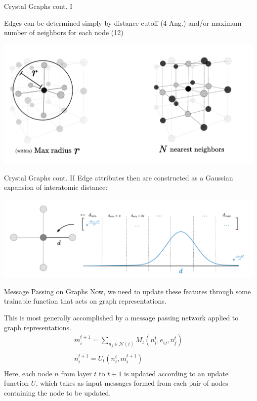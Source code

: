 \documentclass[11pt]{beamer}
\begin{document}
\begin{frame}{Crystal Graphs cont. I}

Edges can be determined simply by distance cutoff (4 Ang.) and/or maximum number of neighbors for each node (12)

\begin{center}
\includegraphics[scale=0.45]{ex_bondcriteria.pdf}
\end{center}
\end{frame}

\begin{frame}{Crystal Graphs cont. II}
Edge attributes then are constructed as a Gaussian expansion of interatomic distance:

\begin{center}
\includegraphics[scale=0.33]{bond_feat.pdf}
\end{center}
\end{frame}

\begin{frame}{Message Passing on Graphs}
Now, we need to update these features through some trainable function that acts on graph representations.


\medskip\pause

This is most generally accomplished by a message passing network applied to graph representations.\pause
\begin{gather*}
m_i^{t+1}=\sum_{n_j\in \mathcal{N}(i)} M_t(n_i^{t},e_{ij},n_j^t )\\
\\ 
n_i^{t+1}=U_t(n_i^t,m_i^{t+1})\\
\end{gather*}
Here, each node $n$ from layer $t$ to $t+1$ is updated according to an update function $U$, which takes as input messages formed from each pair of nodes containing the node to be updated.
\end{frame}
\end{document}
